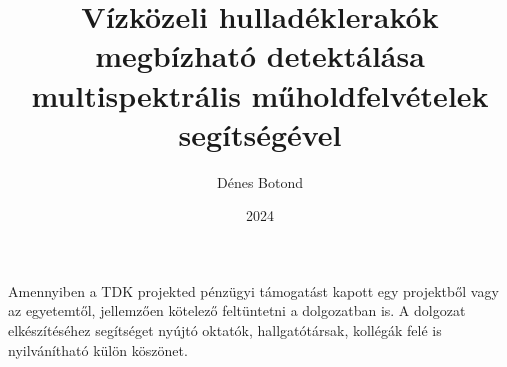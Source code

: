 \documentclass[
]{elteiktdk}[2023/04/10]
\title{Vízközeli hulladéklerakók megbízható detektálása multispektrális műholdfelvételek segítségével}
\date{2024}
\author{Dénes Botond}
\affiliation{egyetemi tanársegéd}
\begin{document}


\makecover
\cleardoublepage
\maketitle

\tableofcontents
\cleardoublepage


\cleardoublepage


\cleardoublepage


\cleardoublepage


\cleardoublepage


\cleardoublepage

\chapter*{\acklabel}
Amennyiben a TDK projekted pénzügyi támogatást kapott egy projektből vagy az egyetemtől, jellemzően kötelező feltüntetni a dolgozatban is. A dolgozat elkészítéséhez segítséget nyújtó oktatók, hallgatótársak, kollégák felé is nyilvánítható külön köszönet.

\appendix

\cleardoublepage

{}
\printbibliography[title=\biblabel]
\cleardoublepage

{}
\listoffigures
\cleardoublepage

{}
\listoftables
\cleardoublepage

{}
\listofalgorithms
\cleardoublepage

{}
\lstlistoflistings
\cleardoublepage

\end{document}
